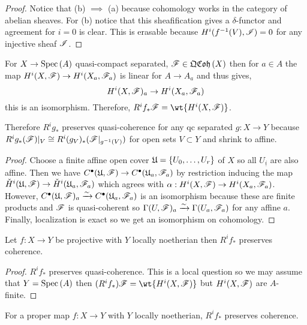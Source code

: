 \documentclass[12pt]{article}
\begin{document}
\begin{proof}
Notice that (b) $\implies$ (a) because cohomology works in the category of abelian sheaves. For (b) notice that this sheafification gives a $\delta$-functor and agreement for $i = 0$ is clear. This is erasable because $H^i(f^{-1}(V), \mathscr{I}) = 0$ for any injective sheaf $\mathscr{I}$. 
\end{proof}

\begin{lemma}
For $X \to \mathrm{Spec}\left( A \right)$ quasi-compact separated, $\mathscr{F} \in \mathfrak{QCoh}\left(X\right)$ then for $a \in A$ the map $H^i(X, \mathscr{F}) \to H^i(X_a, \mathscr{F}_a)$ is linear for $A \to A_a$ and thus gives,
\[ H^i(X, \mathscr{F})_a \to H^i(X_a, \mathscr{F}_a) \]
this is an isomorphism. Therefore, $R^i f_* \F = \wt{H^i(X, \F)}$. 
\end{lemma}

\begin{rmk}
Therefore $R^i g_*$ preserves quasi-coherence for any qc separated $g : X \to Y$ because $R^i g_* (\mathscr{F})|_V \cong R^i(g_V)_* (\mathscr{F}|_{g^{-1}(V)})$ for open sets $V \subset Y$ and shrink to affine.
\end{rmk}

\begin{proof}
Choose a finite affine open cover $\mathfrak{U} = \{ U_0, \dots, U_r \}$ of $X$ so all $U_{\underline{i}}$ are also affine. Then we have $C^\bullet(\mathfrak{U}, \mathscr{F}) \to C^\bullet(\mathfrak{U}_a, \mathscr{F}_a)$ by restriction inducing the map $\check{H}^i(\mathfrak{U}, \mathscr{F}) \to \check{H}^i(\mathfrak{U}_a, \mathscr{F}_a)$ which agrees with $\alpha : H^i(X, \mathscr{F}) \to H^i(X_a, \mathscr{F}_a)$. However, $C^\bullet(\mathfrak{U}, \mathscr{F})_a \xrightarrow{\sim} C^\bullet(\mathfrak{U}_a, \mathscr{F}_a)$ is an isomorphism because these are finite products and $\mathscr{F}$ is quasi-coherent so $\Gamma(U, \mathscr{F})_a \xrightarrow{\sim} \Gamma(U_a, \mathscr{F}_a)$ for any affine $a$. Finally, localization is exact so we get an isomorphism on cohomology. 
\end{proof}

\begin{cor}
Let $f : X \to Y$ be projective with $Y$ locally noetherian then $R^i f_*$ preserves coherence. 
\end{cor}

\begin{proof}
$R^i f_*$ preserves quasi-coherence. This is a local question so we may assume that $Y = \mathrm{Spec}\left( A \right)$ then $(R^i f_*) \F = \wt{H^i(X, \F)}$ but $H^i(X, \mathscr{F})$ are $A$-finite.  
\end{proof}

\begin{thm}
For a proper map $f : X \to Y$ with $Y$ locally noetherian, $R^i f_*$ preserves coherence. 
\end{thm}
\end{document}
